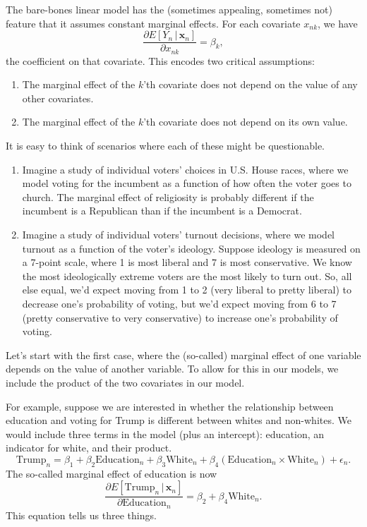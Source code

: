 \documentclass[
  12pt,
  oneside,openany]{book}
\begin{document}
The bare-bones linear model has the (sometimes appealing, sometimes not) feature that it assumes constant marginal effects. For each covariate \(x_{nk}\), we have
\[
\frac{\partial{}E[Y_n \,|\, \mathbf{x}_n]}{\partial{}x_{nk}} = \beta_k,
\]
the coefficient on that covariate. This encodes two critical assumptions:

\begin{enumerate}
\def\labelenumi{\arabic{enumi}.}
\item
  The marginal effect of the \(k\)'th covariate does not depend on the value of any other covariates.
\item
  The marginal effect of the \(k\)'th covariate does not depend on its own value.
\end{enumerate}

It is easy to think of scenarios where each of these might be questionable.

\begin{enumerate}
\def\labelenumi{\arabic{enumi}.}
\item
  Imagine a study of individual voters' choices in U.S. House races, where we model voting for the incumbent as a function of how often the voter goes to church. The marginal effect of religiosity is probably different if the incumbent is a Republican than if the incumbent is a Democrat.
\item
  Imagine a study of individual voters' turnout decisions, where we model turnout as a function of the voter's ideology. Suppose ideology is measured on a 7-point scale, where 1 is most liberal and 7 is most conservative. We know the most ideologically extreme voters are the most likely to turn out. So, all else equal, we'd expect moving from 1 to 2 (very liberal to pretty liberal) to decrease one's probability of voting, but we'd expect moving from 6 to 7 (pretty conservative to very conservative) to increase one's probability of voting.
\end{enumerate}

Let's start with the first case, where the (so-called) marginal effect of one variable depends on the value of another variable. To allow for this in our models, we include the product of the two covariates in our model.

For example, suppose we are interested in whether the relationship between education and voting for Trump is different between whites and non-whites. We would include three terms in the model (plus an intercept): education, an indicator for white, and their product.
\[
\text{Trump}_n = \beta_1 + \beta_2 \text{Education}_n + \beta_3 \text{White}_n + \beta_4 (\text{Education}_n \times \text{White}_n) + \epsilon_n.
\]
The so-called marginal effect of education is now
\[
\frac{\partial{}E[\text{Trump}_n \,|\, \mathbf{x}_n]}{\partial{}\text{Education}_n}
= \beta_2 + \beta_4 \text{White}_n.
\]
This equation tells us three things.
\end{document}
